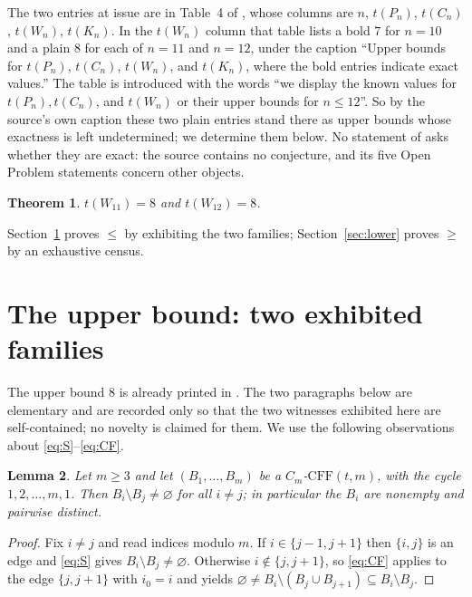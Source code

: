 \documentclass[11pt]{amsart}
\newtheorem{theorem}{Theorem}
\newtheorem{lemma}[theorem]{Lemma}
\newcommand{\CFF}{\mathrm{CFF}}
\begin{document}
\medskip
The two entries at issue are in Table~4 of \cite{PM}, whose columns are $n$,
$t(P_n)$, $t(C_n)$, $t(W_n)$, $t(K_n)$. In the $t(W_n)$ column that table lists
a bold $7$ for $n=10$ and a plain $8$ for each of $n=11$ and $n=12$, under the
caption ``Upper bounds for $t(P_n)$, $t(C_n)$, $t(W_n)$, and $t(K_n)$, where
the bold entries indicate exact values.'' The table is introduced with the
words ``we display the known values for $t(P_n), t(C_n)$, and $t(W_n)$ or their
upper bounds for $n \leq 12$''. So by the source's own caption these two plain
entries stand there as upper bounds whose exactness is left undetermined; we
determine them below. No statement of \cite{PM} asks whether they are exact:
the source contains no conjecture, and its five Open Problem statements concern
other objects.

\begin{theorem}\label{thm:main}
$t(W_{11})=8$ and $t(W_{12})=8$.
\end{theorem}

Section~\ref{sec:upper} proves $\le$ by exhibiting the two families;
Section~\ref{sec:lower} proves $\ge$ by an exhaustive census.

\section{The upper bound: two exhibited families}\label{sec:upper}

The upper bound $8$ is already printed in \cite{PM}. The two paragraphs below
are elementary and are recorded only so that the two witnesses exhibited here
are self-contained; no novelty is claimed for them. We use the following
observations about \eqref{eq:S}--\eqref{eq:CF}.

\begin{lemma}\label{lem:anti}
Let $m\ge3$ and let $(B_1,\dots,B_m)$ be a $C_m$-$\CFF(t,m)$, with the cycle
$1,2,\dots,m,1$. Then $B_i\setminus B_j\neq\varnothing$ for all $i\neq j$; in
particular the $B_i$ are nonempty and pairwise distinct.
\end{lemma}

\begin{proof}
Fix $i\neq j$ and read indices modulo $m$. If $i\in\{j-1,j+1\}$ then $\{i,j\}$
is an edge and \eqref{eq:S} gives $B_i\setminus B_j\neq\varnothing$. Otherwise
$i\notin\{j,j+1\}$, so \eqref{eq:CF} applies to the edge $\{j,j+1\}$ with
$i_0=i$ and yields
$\varnothing\neq B_i\setminus(B_j\cup B_{j+1})\subseteq B_i\setminus B_j$.
\end{proof}
\end{document}
